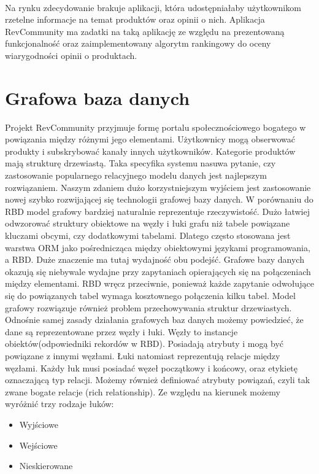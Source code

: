 \paragraph{}
Na rynku zdecydowanie brakuje aplikacji, która udostępniałaby użytkownikom rzetelne informacje na temat produktów oraz opinii o nich. Aplikacja RevCommunity ma zadatki na taką aplikację ze względu na prezentowaną funkcjonalność oraz zaimplementowany algorytm rankingowy do oceny wiarygodności opinii o produktach. 



\section{Grafowa baza danych}

Projekt RevCommunity przyjmuje formę portalu społecznościowego bogatego w powiązania między różnymi jego elementami. Użytkownicy mogą obserwować produkty i subskrybować kanały innych użytkowników. Kategorie produktów mają strukturę drzewiastą. Taka specyfika systemu nasuwa pytanie, czy zastosowanie popularnego relacyjnego modelu danych jest najlepszym rozwiązaniem. Naszym zdaniem dużo korzystniejszym wyjściem jest zastosowanie nowej szybko rozwijającej się technologii grafowej bazy danych. W porównaniu do RBD model grafowy bardziej naturalnie reprezentuje rzeczywistość. Dużo łatwiej odwzorować struktury obiektowe na węzły i łuki grafu niż tabele powiązane kluczami obcymi, czy dodatkowymi tabelami. Dlatego często stosowana jest warstwa ORM jako pośrednicząca między obiektowymi językami programowania, a RBD. Duże znaczenie ma tutaj wydajność obu podejść. Grafowe bazy danych okazują się niebywale wydajne przy zapytaniach opierających się na połączeniach między elementami. RBD wręcz przeciwnie, ponieważ każde zapytanie odwołujące się do powiązanych tabel wymaga kosztownego połączenia kilku tabel. Model grafowy rozwiązuje również problem przechowywania struktur drzewiastych.
Odnośnie samej zasady działania grafowych baz danych możemy powiedzieć, że dane są reprezentowane przez węzły i łuki. Węzły to instancje obiektów(odpowiedniki rekordów w RBD). Posiadają atrybuty i mogą być powiązane z innymi węzłami. Łuki natomiast reprezentują relacje między węzłami. Każdy łuk musi posiadać węzeł początkowy i końcowy, oraz etykietę oznaczającą typ relacji. Możemy również definiować atrybuty powiązań, czyli tak zwane bogate relacje (rich relationship). Ze względu na kierunek możemy wyróżnić trzy rodzaje łuków:
\begin{itemize}
\item Wyjściowe
\item Wejściowe
\item Nieskierowane
\end{itemize}


